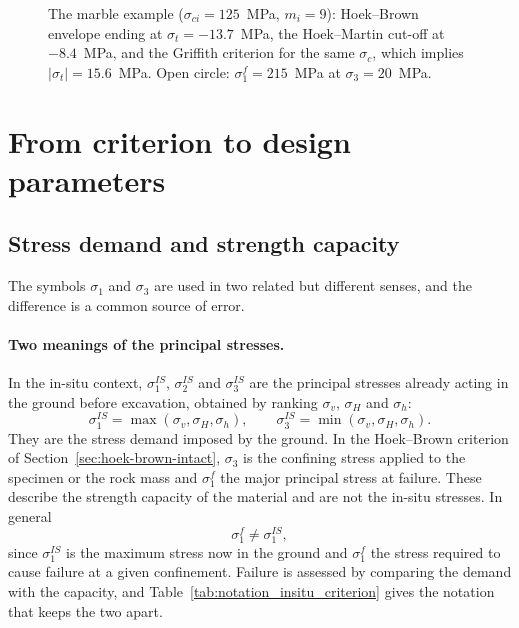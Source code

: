 \begin{figure}[htbp]
\centering
{}
\caption{The marble example ($\sigma_{ci} = 125$~MPa, $m_i = 9$): Hoek--Brown envelope ending at $\sigma_t = -13.7$~MPa, the Hoek--Martin cut-off at $-8.4$~MPa, and the Griffith criterion for the same $\sigma_c$, which implies $|\sigma_t| = 15.6$~MPa. Open circle: $\sigma_1^f = 215$~MPa at $\sigma_3 = 20$~MPa.}
\label{fig:griffith-hb-marble}
\end{figure}

\section{From criterion to design parameters}
\label{sec:criteria-in-application}

\subsection{Stress demand and strength capacity}
\label{sec:demand-and-capacity}

The symbols \(\sigma_1\) and \(\sigma_3\) are used in two related but
different senses, and the difference is a common source of error.

\paragraph{Two meanings of the principal stresses.}
In the in-situ context, \(\sigma_1^{IS}\), \(\sigma_2^{IS}\) and
\(\sigma_3^{IS}\) are the principal stresses already acting in the ground
before excavation, obtained by ranking \(\sigma_v\), \(\sigma_H\) and
\(\sigma_h\):
\[
\sigma_1^{IS} = \max(\sigma_v,\sigma_H,\sigma_h) ,
\qquad
\sigma_3^{IS} = \min(\sigma_v,\sigma_H,\sigma_h) .
\]
They are the stress demand imposed by the ground. In the Hoek--Brown
criterion of Section~\ref{sec:hoek-brown-intact}, \(\sigma_3\) is the
confining stress applied to the specimen or the rock
mass and \(\sigma_1^f\) the major principal stress at failure. These describe
the strength capacity of the material and are not the in-situ stresses. In
general
\[
\sigma_1^f \neq \sigma_1^{IS} ,
\]
since \(\sigma_1^{IS}\) is the maximum stress now in the ground and
\(\sigma_1^f\) the stress required to cause failure at a given confinement.
Failure is assessed by comparing the demand with the capacity, and
Table~\ref{tab:notation_insitu_criterion} gives the notation that keeps the
two apart.

